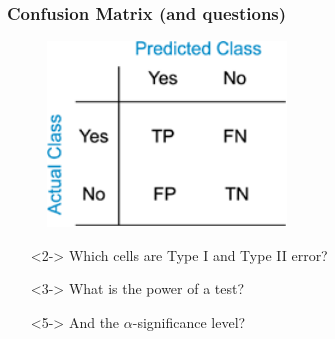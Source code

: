 \documentclass[xcolor={dvipsnames}]{beamer}
\begin{document}
\frame
{
\frametitle{Confusion Matrix (and questions)}

\begin{figure}
\centering
\includegraphics[width=2.5in]{stuff/confusionmatrix.png}
\end{figure}

\begin{itemize}
\item[]<2-> Which cells are Type I and Type II error?
\item[]<3-> What is the power of a test?  
\item[]<5-> And the $\alpha$-significance level? 

\end{itemize}

}
\end{document}
